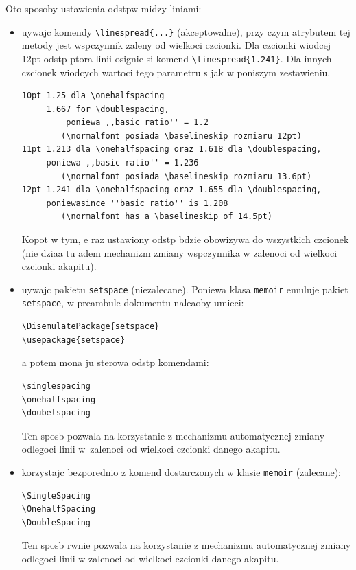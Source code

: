 Oto sposoby ustawienia odstpw midzy liniami:
\begin{itemize}
\item uywajc komendy \verb+\linespread{...}+ (akceptowalne), przy czym atrybutem tej metody jest wspczynnik zaleny od wielkoci
czcionki.  Dla czcionki wiodcej 12pt odstp ptora linii osignie si komend \verb+\linespread{1.241}+. Dla innych czcionek wiodcych wartoci tego parametru s jak w poniszym zestawieniu.
\begin{lstlisting}[basicstyle=\footnotesize\ttfamily]
10pt 1.25 dla \onehalfspacing 
     1.667 for \doublespacing, 
		 poniewa ,,basic ratio'' = 1.2 
		(\normalfont posiada \baselineskip rozmiaru 12pt)
11pt 1.213 dla \onehalfspacing oraz 1.618 dla \doublespacing, 
     poniewa ,,basic ratio'' = 1.236 
		(\normalfont posiada \baselineskip rozmiaru 13.6pt)
12pt 1.241 dla \onehalfspacing oraz 1.655 dla \doublespacing, 
     poniewasince ''basic ratio'' is 1.208 
		(\normalfont has a \baselineskip of 14.5pt)
\end{lstlisting}
Kopot w tym, e raz ustawiony odstp bdzie obowizywa do wszystkich czcionek (nie dziaa tu adem mechanizm zmiany wspczynnika w zalenoci od wielkoci czcionki akapitu).

\item uywajc pakietu \texttt{setspace} (niezalecane). Poniewa klasa \texttt{memoir} emuluje pakiet \texttt{setspace}, w preambule dokumentu naleaoby umieci:
\begin{lstlisting}[basicstyle=\footnotesize\ttfamily]
\DisemulatePackage{setspace}
\usepackage{setspace}
\end{lstlisting}
a potem mona ju sterowa odstp komendami:
\begin{lstlisting}[basicstyle=\footnotesize\ttfamily]
\singlespacing
\onehalfspacing
\doubelspacing
\end{lstlisting}
Ten sposb pozwala na korzystanie z mechanizmu automatycznej zmiany odlegoci linii w~zalenoci od wielkoci czcionki danego akapitu.
\item korzystajc bezporednio z komend dostarczonych w klasie \texttt{memoir} (zalecane):
\begin{lstlisting}[basicstyle=\footnotesize\ttfamily]
\SingleSpacing
\OnehalfSpacing
\DoubleSpacing
\end{lstlisting}
Ten sposb rwnie pozwala na korzystanie z mechanizmu automatycznej zmiany odlegoci linii w zalenoci od wielkoci czcionki danego akapitu.
\end{itemize}

